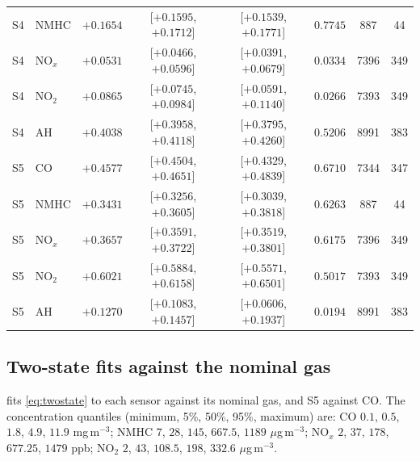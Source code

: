 \documentclass[11pt]{article}
\theoremstyle{definition}\newtheorem{definition}[theorem]{Definition}
\theoremstyle{remark}\newtheorem{remark}[theorem]{Remark}
\begin{document}
\begin{table}[htbp]
\begin{tabular}{@{}llcccccc@{}}
S4 & NMHC & $+0.1654$ & [$+0.1595$, $+0.1712$] & [$+0.1539$, $+0.1771$] & $0.7745$ & 887 & 44\\
S4 & NO$_x$ & $+0.0531$ & [$+0.0466$, $+0.0596$] & [$+0.0391$, $+0.0679$] & $0.0334$ & 7396 & 349\\
S4 & NO$_2$ & $+0.0865$ & [$+0.0745$, $+0.0984$] & [$+0.0591$, $+0.1140$] & $0.0266$ & 7393 & 349\\
S4 & AH & $+0.4038$ & [$+0.3958$, $+0.4118$] & [$+0.3795$, $+0.4260$] & $0.5206$ & 8991 & 383\\
S5 & CO & $+0.4577$ & [$+0.4504$, $+0.4651$] & [$+0.4329$, $+0.4839$] & $0.6710$ & 7344 & 347\\
S5 & NMHC & $+0.3431$ & [$+0.3256$, $+0.3605$] & [$+0.3039$, $+0.3818$] & $0.6263$ & 887 & 44\\
S5 & NO$_x$ & $+0.3657$ & [$+0.3591$, $+0.3722$] & [$+0.3519$, $+0.3801$] & $0.6175$ & 7396 & 349\\
S5 & NO$_2$ & $+0.6021$ & [$+0.5884$, $+0.6158$] & [$+0.5571$, $+0.6501$] & $0.5017$ & 7393 & 349\\
S5 & AH & $+0.1270$ & [$+0.1083$, $+0.1457$] & [$+0.0606$, $+0.1937$] & $0.0194$ & 8991 & 383\\\bottomrule
\end{tabular}
\end{table}

\subsection{Two-state fits against the nominal gas}\label{sec:fitnom}
 fits \eqref{eq:twostate} to each sensor against its nominal gas, and S5 against CO. The concentration quantiles (minimum, 5\%, 50\%, 95\%, maximum) are: CO $0.1$, $0.5$, $1.8$, $4.9$, $11.9$ mg\,m$^{-3}$; NMHC $7$, $28$, $145$, $667.5$, $1189$ $\mu$g\,m$^{-3}$; NO$_x$ $2$, $37$, $178$, $677.25$, $1479$ ppb; NO$_2$ $2$, $43$, $108.5$, $198$, $332.6$ $\mu$g\,m$^{-3}$.
\end{document}
